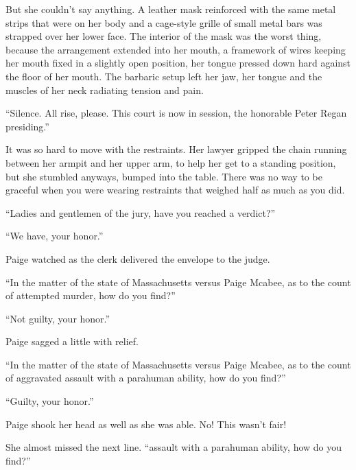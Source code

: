 But she couldn't say anything.  A leather mask reinforced with the same metal strips that were on her body and a cage-style grille of small metal bars was strapped over her lower face.  The interior of the mask was the worst thing, because the arrangement extended into her mouth, a framework of wires keeping her mouth fixed in a slightly open position, her tongue pressed down hard against the floor of her mouth.  The barbaric setup left her jaw, her tongue and the muscles of her neck radiating tension and pain.



``Silence.  All rise, please.  This court is now in session, the honorable Peter Regan presiding.''



It was so hard to move with the restraints.  Her lawyer gripped the chain running between her armpit and her upper arm, to help her get to a standing position, but she stumbled anyways, bumped into the table.  There was no way to be graceful when you were wearing restraints that weighed half as much as you did.



``Ladies and gentlemen of the jury, have you reached a verdict?''



``We have, your honor.''



Paige watched as the clerk delivered the envelope to the judge.



``In the matter of the state of Massachusetts versus Paige Mcabee, as to the count of attempted murder, how do you find?''



``Not guilty, your honor.''



Paige sagged a little with relief.



``In the matter of the state of Massachusetts versus Paige Mcabee, as to the count of aggravated assault with a parahuman ability, how do you find?''



``Guilty, your honor.''



Paige shook her head as well as she was able.  No!  This wasn't fair!



She almost missed the next line.  ``\ldotssexual assault with a parahuman ability, how do you find?''



